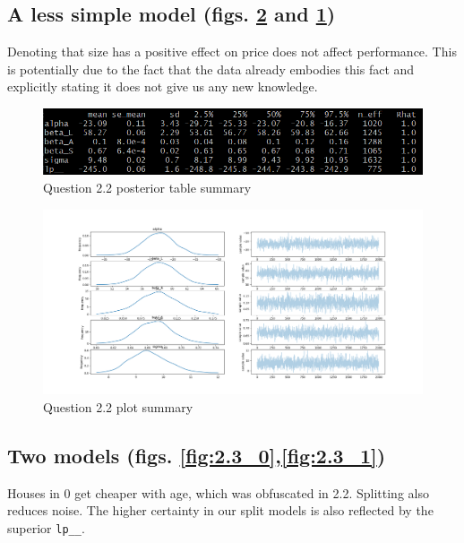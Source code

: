 \documentclass[11pt,a4paper,titlepage]{article}
\begin{document}
  \subsection{A less simple model (figs. \ref{fig:2.2} and \ref{tab:2.2})}
  Denoting that size has a positive effect on price does not affect performance. This is potentially due to the fact that the data already embodies this fact and explicitly stating it does not give us any new knowledge.

  \begin{figure}[htb]
    \centering
      \includegraphics[width=\textwidth]{../q22/q22_table_summary.png}
      \caption{Question 2.2 posterior table summary}
    \label{tab:2.2}
  \end{figure}

  \begin{figure}[htb]
    \centering
      \includegraphics[width=\textwidth]{../q22/q22_plot_summary.png}
      \caption{Question 2.2 plot summary}
    \label{fig:2.2}
  \end{figure}

  \subsection{Two models (figs. \ref{fig:2.3_0},\ref{fig:2.3_1})}
  Houses in 0 get cheaper with age, which was obfuscated in 2.2. Splitting also reduces noise. The higher certainty in our split models is also reflected by the superior \texttt{lp\_\_}.
\end{document}
